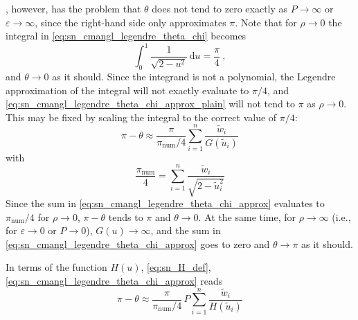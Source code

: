 , however, has the problem that $\theta$ does not tend to zero exactly as $P \rightarrow \infty$ or $\varepsilon \rightarrow \infty$, since the right-hand side only approximates $\pi$.
Note that for \(\rho \rightarrow 0\) the integral in \cref{eq:sn_cmangl_legendre_theta_chi} becomes
%
\begin{equation}
    \label{eq:sn_cmangl_legendre_pi}
    \int_0^1 \frac{ 1 }{ \sqrt{ 2-u^2 } } \, \mathrm{d}u = \frac{ \pi }{ 4 } ~,
\end{equation}
%
and \(\theta \rightarrow 0\) as it should.
Since the integrand is not a polynomial, the Legendre approximation of the integral will not exactly evaluate to \(\pi/4\), and \cref{eq:sn_cmangl_legendre_theta_chi_approx_plain} will not tend to $\pi$ as \(\rho \rightarrow 0\).
This may be fixed by scaling the integral to the correct value of \(\pi/4\):
%
\begin{equation}
    \label{eq:sn_cmangl_legendre_theta_chi_approx}
    \pi - \theta \approx
        \frac{ \pi }{ \pi_\mathrm{num}/4 }
        \sum_{i=1}^n \frac{ \tilde{w}_i }{ G(\tilde{u}_i) }
\end{equation}
%
with
%
\begin{equation}
    \label{eq:sn_cmangl_legendre_pinum}
    \frac{\pi_\mathrm{num}}{4} =
        \sum_{i=1}^n \frac{ \tilde{w}_i  }{ \sqrt{ 2-\tilde{u}_i^2 } }
\end{equation}
%
Since the sum in \cref{eq:sn_cmangl_legendre_theta_chi_approx} evaluates to \(\pi_\mathrm{num}/4\) for \(\rho \rightarrow 0\), $\pi - \theta$ tends to $\pi$ and \(\theta \rightarrow 0\).
At the same time, for \(\rho \rightarrow \infty\) (i.e., for $\varepsilon \rightarrow 0$ or $P \rightarrow 0$), $G(u) \rightarrow \infty$, and the sum in \cref{eq:sn_cmangl_legendre_theta_chi_approx} goes to zero and \(\theta \rightarrow \pi\) as it should.

In terms of the function $H(u)$, \cref{eq:sn_H_def}, \cref{eq:sn_cmangl_legendre_theta_chi_approx} reads
%
\begin{equation}
    \label{eq:sn_cmangl_legendre_theta_H_approx}
    \pi - \theta \approx
        \frac{ \pi }{ \pi_\mathrm{num}/4 }  \,
        P \sum_{i=1}^n \frac{ \tilde{w}_i }{ H(\tilde{u}_i) }
\end{equation}

